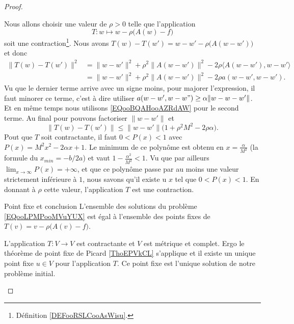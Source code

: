 \begin{proof}
\begin{subproof}
                Nous allons choisir une valeur de \( \rho>0\) telle que l'application
                \begin{equation}
                    T\colon w\mapsto w-\rho\big( A(w)-f \big)
                \end{equation}
                soit une contraction\footnote{Définition \ref{DEFooRSLCooAsWisu}.}. Nous avons \( T(w)-T(w')=w-w'-\rho\big( A(w-w') \big)\) et donc
                \begin{subequations}
                    \begin{align}
                        \| T(w)-T(w') \|^2&=\| w-w' \|^2+\rho^2\| A(w-w') \|^2-2\rho\langle A(w-w'), w-w'\rangle \\
                        &=\| w-w' \|^2+\rho^2\| A(w-w') \|^2-2\rho a(w-w',w-w').
                    \end{align}
                \end{subequations}
                Vu que le dernier terme arrive avec un signe moins, pour majorer l'expression, il faut minorer ce terme, c'est à dire utiliser \( a(w-w',w-w")\geq \alpha\| w-w-w' \|\). Et en même temps nous utilisons \eqref{EQooBQAHooAZRdAW} pour le second terme. Au final pour pouvons factoriser \( \| w-w' \|\) et 
                \begin{equation}
                    \| T(w)-T(w') \|\leq \| w-w' \|\big( 1+\rho^2M^2-2\rho\alpha \big).
                \end{equation}
                Pout que \( T\) soit contractante, il faut \( 0<P(x)<1\) avec \( P(x)=M^2x^2-2\alpha x+1\). Le minimum de ce polynôme est obtenu en \( x=\frac{ \alpha }{ M^2 }\) (la formule du \( x_{min}=-b/2a\)) et vaut \( 1-\frac{ \alpha^2 }{ M^2 }<1\). Vu que par ailleurs \( \lim_{x\to \infty} P(x)=+\infty\), et que ce polynôme passe par au moins une valeur strictement inférieure à \( 1\), nous savons qu'il existe u \( x\) tel que \( 0<P(x)<1\). En donnant à \( \rho\) cette valeur, l'application \( T\) est une contraction.

            \item[Point fixe et conclusion]
                L'ensemble des solutions du problème \eqref{EQooLPMPooMVuYUX} est égal à l'ensemble des points fixes de \( T(v)=v-\rho\big( A(v)-f \big)\).

                L'application \( T\colon V\to V\) est contractante et \( V\) est métrique et complet. Ergo le théorème de point fixe de Picard \ref{ThoEPVkCL} s'applique et il existe un unique point fixe \( u\in V\) pour l'application \( T\). Ce point fixe est l'unique solution de notre problème initial.


\end{subproof}
\end{proof}
